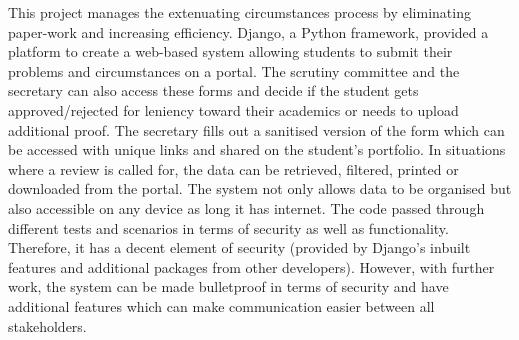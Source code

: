 \documentclass[../main.tex]{subfiles}
\begin{document}
\raggedright
This project manages the extenuating circumstances process by eliminating paper-work and increasing efficiency. Django, a Python framework, provided a platform to create a web-based system allowing students to submit their problems and circumstances on a portal. The scrutiny committee and the secretary can also access these forms and decide if the student gets approved/rejected for leniency toward their academics or needs to upload additional proof. The secretary fills out a sanitised version of the form which can be accessed with unique links and shared on the student's portfolio. In situations where a review is called for, the data can be retrieved, filtered, printed or downloaded from the portal. The system not only allows data to be organised but also accessible on any device as long it has internet. The code passed through different tests and scenarios in terms of security as well as functionality. Therefore, it has a decent element of security (provided by Django's inbuilt features and additional packages from other developers). However, with further work, the system can be made bulletproof in terms of security and have additional features which can make communication easier between all stakeholders. 
\end{document}
